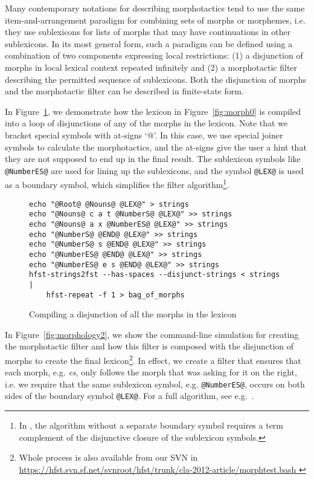 \documentclass[draft]{llncs}
\begin{document}
Many contemporary notations for describing morphotactics tend to use the same item-and-arrangement paradigm for
combining sets of morphs or morphemes, i.e. they use sublexicons for lists of morphs that may 
have continuations in other sublexicons. 
In its most general form, such a paradigm can be defined using a combination of two components expressing local restrictions:
(1) a disjunction of morphs in local lexical context repeated infinitely and 
(2) a morphotactic filter describing the permitted sequence of sublexicons.
Both the disjunction of morphs and the morphotactic filter can be described in finite-state form.

In Figure~\ref{fig:morphology1}, we demonstrate how the lexicon in
Figure~\ref{fig:morph0} is compiled into a loop of disjunctions of any of the
morphs in the lexicon. Note that we bracket special symbols with at-signs `@'. In
this case, we use special joiner symbols to calculate the morphotactics, and the
at-signs give the user a hint that they are not supposed to end up in the final
result. The sublexicon symbols like \texttt{@NumberES@} are used for lining up 
the sublexicons, and the symbol \texttt{@LEX@} is used as a boundary symbol, which simplifies the filter
algorithm\footnote{In \cite{linden/2009/sfcm}, the algorithm without a separate
boundary symbol requires a term complement of the disjunctive closure of the sublexicon
symbols.}.

\begin{figure} [h!]
{\footnotesize
\begin{verbatim}
echo "@Root@ @Nouns@ @LEX@" > strings
echo "@Nouns@ c a t @NumberS@ @LEX@" >> strings
echo "@Nouns@ a x @NumberES@ @LEX@" >> strings
echo "@NumberS@ @END@ @LEX@" >> strings
echo "@NumberS@ s @END@ @LEX@" >> strings
echo "@NumberES@ @END@ @LEX@" >> strings
echo "@NumberES@ e s @END@ @LEX@" >> strings
hfst-strings2fst --has-spaces --disjunct-strings < strings  | 
    hfst-repeat -f 1 > bag_of_morphs

\end{verbatim}
}
\caption{Compiling a disjunction of all the morphs in the lexicon}
\label{fig:morphology1}
\end{figure}

In Figure~\ref{fig:morphology2}, we show the command-line simulation for
creating the morphotactic filter and how this filter is composed with the
disjunction of morphs to create the final lexicon\footnote{Whole process is
also available from our SVN in
\url{https://hfst.svn.sf.net/svnroot/hfst/trunk/cla-2012-article/morphtest.bash
}}. In effect, we create a filter
that ensures that each morph, e.g. \emph{es}, only follows the morph that
was asking for it on the right, i.e. we require that the same sublexicon symbol, e.g. \texttt{@NumberES@},
occurs on both sides of the boundary symbol \texttt{@LEX@}. For a full algorithm, see e.g.~\cite{linden/2009/sfcm}.
\end{document}
